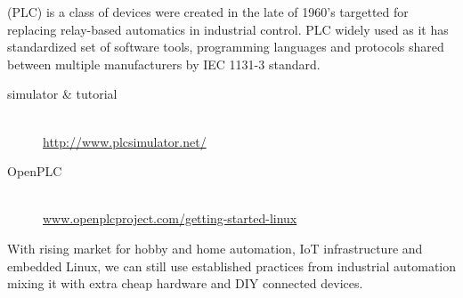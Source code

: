 \clearpage
{}\secdown

 (PLC) is a class of devices were created in
the late of 1960's targetted for replacing relay-based automatics in industrial
control. PLC widely used as it has standardized set of software tools,
programming languages and protocols shared between multiple manufacturers by IEC
1131-3 standard.

\begin{description}
\item[simulator \& tutorial]\ \\
\url{http://www.plcsimulator.net/}
\item[OpenPLC]\ \\
\url{www.openplcproject.com/getting-started-linux}
\end{description}

\pg With rising market for hobby and home automation, IoT infrastructure and
embedded Linux, we can still use established practices from industrial
automation mixing it with extra cheap hardware and DIY connected devices.

\secup
